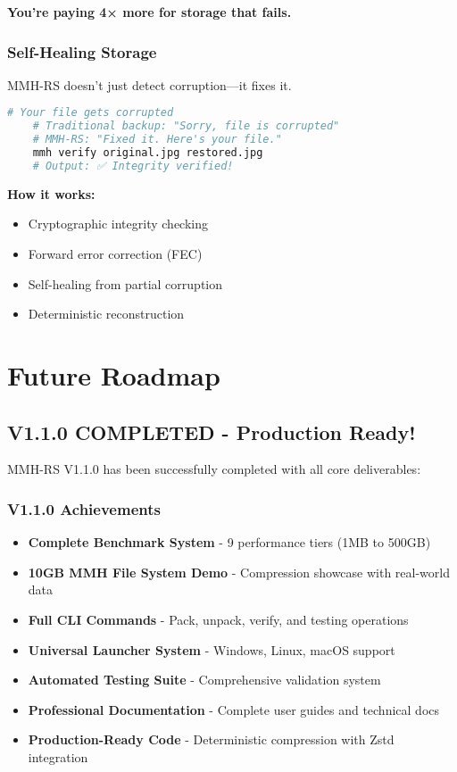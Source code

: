 \documentclass[11pt,a4paper]{article}
\begin{document}
	\textbf{You're paying 4× more for storage that fails.}

	\subsubsection{Self-Healing Storage}

	MMH-RS doesn't just detect corruption—it fixes it.

	\begin{lstlisting}[language=bash]
	# Your file gets corrupted
	# Traditional backup: "Sorry, file is corrupted"
	# MMH-RS: "Fixed it. Here's your file."
	mmh verify original.jpg restored.jpg
	# Output: ✅ Integrity verified!
	\end{lstlisting}

	\textbf{How it works:}
	\begin{itemize}
		\item Cryptographic integrity checking
		\item Forward error correction (FEC)
		\item Self-healing from partial corruption
		\item Deterministic reconstruction
	\end{itemize}

	\section{Future Roadmap}
	\label{sec:roadmap}

	\subsection{V1.1.0 COMPLETED - Production Ready!}

	MMH-RS V1.1.0 has been successfully completed with all core deliverables:

	\subsubsection{V1.1.0 Achievements}
	\begin{itemize}
		\item \textbf{Complete Benchmark System} - 9 performance tiers (1MB to 500GB)
		\item \textbf{10GB MMH File System Demo} - Compression showcase with real-world data
		\item \textbf{Full CLI Commands} - Pack, unpack, verify, and testing operations
		\item \textbf{Universal Launcher System} - Windows, Linux, macOS support
		\item \textbf{Automated Testing Suite} - Comprehensive validation system
		\item \textbf{Professional Documentation} - Complete user guides and technical docs
		\item \textbf{Production-Ready Code} - Deterministic compression with Zstd integration
	\end{itemize}
\end{document}
